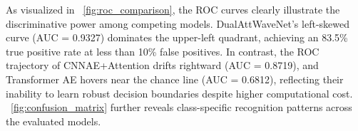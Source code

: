 \documentclass[conference]{IEEEtran}
\begin{document}
As visualized in \figurename~\ref{fig:roc_comparison}, the ROC curves clearly illustrate the discriminative power among competing models. DualAttWaveNet's left-skewed curve (AUC = 0.9327) dominates the upper-left quadrant, achieving an 83.5\% true positive rate at less than 10\% false positives. In contrast, the ROC trajectory of CNNAE+Attention drifts rightward (AUC = 0.8719), and Transformer AE hovers near the chance line (AUC = 0.6812), reflecting their inability to learn robust decision boundaries despite higher computational cost. \figurename~\ref{fig:confusion_matrix} further reveals class-specific recognition patterns across the evaluated models.

\begin{table}[t]
    \caption{Performance Comparison of DualAttWaveNet Against Baseline Models}
    \label{tab:main_results}
    \centering
\end{table}
\end{document}
